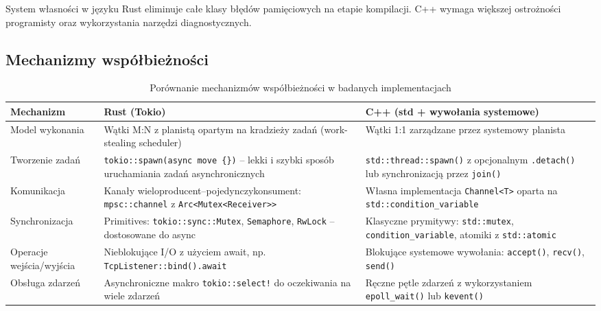 System własności w języku Rust eliminuje całe klasy błędów pamięciowych na etapie kompilacji. C++ wymaga większej ostrożności programisty oraz wykorzystania narzędzi diagnostycznych.

\subsection{Mechanizmy współbieżności}

\begin{table}[H]
    \centering
    \caption{Porównanie mechanizmów współbieżności w badanych implementacjach}
    \renewcommand{\arraystretch}{1.3}
    \begin{tabularx}{\textwidth}{l>{\raggedright\arraybackslash}X>{\raggedright\arraybackslash}X}
        \toprule
        \textbf{Mechanizm} &
        \textbf{Rust (Tokio)} &
        \textbf{C++ (std + wywołania systemowe)} \\
        \midrule
        Model wykonania &
        Wątki M:N z planistą opartym na kradzieży zadań (work-stealing scheduler) &
        Wątki 1:1 zarządzane przez systemowy planista \\
        \midrule
        Tworzenie zadań &
        \texttt{tokio::spawn(async move \{\})} – lekki i szybki sposób uruchamiania zadań asynchronicznych &
        \texttt{std::thread::spawn()} z opcjonalnym \texttt{.detach()} lub synchronizacją przez \texttt{join()} \\
        \midrule
        Komunikacja &
        Kanały wieloproducent–pojedynczykonsument: \texttt{mpsc::channel} z \texttt{Arc<Mutex<Receiver>>} &
        Własna implementacja \texttt{Channel<T>} oparta na \texttt{std::condition\_variable} \\
        \midrule
        Synchronizacja &
        Primitives: \texttt{tokio::sync::Mutex}, \texttt{Semaphore}, \texttt{RwLock} – dostosowane do async &
        Klasyczne prymitywy: \texttt{std::mutex}, \texttt{condition\_variable}, atomiki z \texttt{std::atomic} \\
        \midrule
        Operacje wejścia/wyjścia &
        Nieblokujące I/O z użyciem await, np. \texttt{TcpListener::bind().await} &
        Blokujące systemowe wywołania: \texttt{accept()}, \texttt{recv()}, \texttt{send()} \\
        \midrule
        Obsługa zdarzeń &
        Asynchroniczne makro \texttt{tokio::select!} do oczekiwania na wiele zdarzeń &
        Ręczne pętle zdarzeń z wykorzystaniem \texttt{epoll\_wait()} lub \texttt{kevent()} \\

\end{tabularx}
\end{table}
